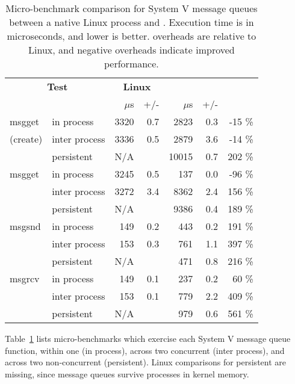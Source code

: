 \begin{table}[t!b!]
\footnotesize
\centering
\begin{tabular}{|ll|rr|rrr|}
\hline
\multicolumn{2}{|c|}{{\bf Test}} &
\multicolumn{2}{|c|}{{\bf Linux}} &
\multicolumn{3}{|c|}{{\bf \sysname{}}} \\
 & & $\mu$s & +/- & $\mu$s & +/- & \\
\hline
msgget & in process	&	3320	& 0.7 &	2823	& 0.3 &	-15	\%	\\
(create) & inter process	&	3336	& 0.5 &	2879	& 3.6 &	-14	\%	\\
            & persistent	&	N/A	& &	10015	& 0.7 &	202	\%	\\
\hline								
msgget & in process	&	3245	& 0.5 &	137	& 0.0 &	-96	\%	\\
            & inter process	&	3272	& 3.4 &	8362	& 2.4 &	156	\%	\\
            & persistent	&	N/A	& &	9386	& 0.4 &	189	\%	\\
\hline								
msgsnd & in process	&	149	& 0.2 &	443	& 0.2 &	191	\%	\\
             & inter process	&	153	& 0.3 &	761	& 1.1 &	397	\%	\\
             & persistent	&	N/A	& &	471	& 0.8 &	216	\%	\\
\hline								
msgrcv & in process	&	149	& 0.1 &	237	& 0.2 &	60	\%	\\
            & inter process	&	153	& 0.1 &	779	& 2.2 &	409	\%	\\
            & persistent	&	N/A	& &	979	& 0.6 &	561	\%	\\\hline
\end{tabular}
\caption[\sysname{}: micro-benchmark for System V message queues.]
{Micro-benchmark comparison for System V message queues
between a native Linux process and \sysname{} \picoprocs{}.
Execution time is in microseconds, and lower is better.
overheads are relative to Linux, and negative overheads indicate improved performance.}
\label{tab:graphene:msgq}
\end{table}

\vspace{5pt}
Table~\ref{tab:graphene:msgq} lists micro-benchmarks
which exercise each System V message queue function,
within one \picoproc{} (in process), across two concurrent \picoprocs{} (inter process),
and across two non-concurrent \picoprocs{} (persistent).
Linux comparisons for persistent are missing, since message queues 
survive processes in kernel memory.

